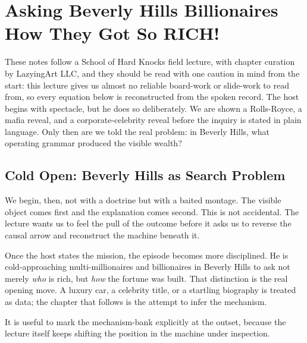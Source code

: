 \chapter{Asking Beverly Hills Billionaires How They Got So RICH!}

These notes follow a School of Hard Knocks field lecture, with chapter curation by LazyingArt LLC, and they should be read with one caution in mind from the start: this lecture gives us almost no reliable board-work or slide-work to read from, so every equation below is reconstructed from the spoken record. The host begins with spectacle, but he does so deliberately. We are shown a Rolls-Royce, a mafia reveal, and a corporate-celebrity reveal before the inquiry is stated in plain language. Only then are we told the real problem: in Beverly Hills, what operating grammar produced the visible wealth?

\section{Cold Open: Beverly Hills as Search Problem}

We begin, then, not with a doctrine but with a baited montage. The visible object comes first and the explanation comes second. This is not accidental. The lecture wants us to feel the pull of the outcome before it asks us to reverse the causal arrow and reconstruct the machine beneath it.

Once the host states the mission, the episode becomes more disciplined. He is cold-approaching multi-millionaires and billionaires in Beverly Hills to ask not merely \emph{who} is rich, but \emph{how} the fortune was built. That distinction is the real opening move. A luxury car, a celebrity title, or a startling biography is treated as data; the chapter that follows is the attempt to infer the mechanism.

It is useful to mark the mechanism-bank explicitly at the outset, because the lecture itself keeps shifting the position in the machine under inspection.

